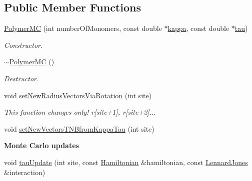 \subsection*{Public Member Functions}
\begin{DoxyCompactItemize}
\item 
\hyperlink{class_p_c_a_1_1_polymer_m_c_a3a792caa4db0fe8a7c749c4b0f6fce25}{Polymer\+MC} (int number\+Of\+Monomers, const double $\ast$\hyperlink{class_p_c_a_1_1_polymer_a1bef29f1613bb4b67981aae7df3d804b}{kappa}, const double $\ast$\hyperlink{class_p_c_a_1_1_polymer_ab3b07298bdbac01a7b20b2554d7b248f}{tau})
\begin{DoxyCompactList}\small\item\em Constructor. \end{DoxyCompactList}\item 
\hyperlink{class_p_c_a_1_1_polymer_m_c_a6ed770992221cd0a7a9e364d4d5fcda3}{$\sim$\+Polymer\+MC} ()
\begin{DoxyCompactList}\small\item\em Destructor. \end{DoxyCompactList}\item 
void \hyperlink{class_p_c_a_1_1_polymer_m_c_a80c92a94292d085a0d0ce0563ae0a1fd}{set\+New\+Radius\+Vectors\+Via\+Rotation} (int site)
\begin{DoxyCompactList}\small\item\em This function changes only! r\mbox{[}site+1\mbox{]}, r\mbox{[}site+2\mbox{]}... \end{DoxyCompactList}\item 
void \hyperlink{class_p_c_a_1_1_polymer_m_c_ab7ec6ffe521bf27c218f4a6eac6c394b}{set\+New\+Vectors\+T\+N\+Bfrom\+Kappa\+Tau} (int site)
\end{DoxyCompactItemize}
\begin{Indent}{\bf Monte Carlo updates}\par
\begin{DoxyCompactItemize}
\item 
void \hyperlink{class_p_c_a_1_1_polymer_m_c_aa5f0b2a0c75a6e01505afe1a600cf59e}{tau\+Update} (int site, const \hyperlink{class_p_c_a_1_1_hamiltonian}{Hamiltonian} \&hamiltonian, const \hyperlink{class_p_c_a_1_1_lennard_jones}{Lennard\+Jones} \&interaction)
\end{DoxyCompactItemize}
\end{Indent}
